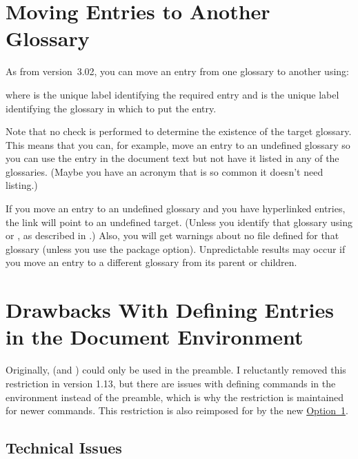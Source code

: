 \documentclass[report,inlinetitle]{nlctdoc}
\newcommand*{\opt}[1]{\hyperlink{option#1}{Option~#1}}
\begin{document}
\section{Moving Entries to Another Glossary}
\label{sec:moveentry}

As from version~3.02, you can move an entry from one glossary to
another using:
\begin{definition}[\DescribeMacro{\glsmoveentry}]
\end{definition}
where  is the unique label identifying the required
entry and  is the unique label
identifying the glossary in which to put the entry.

Note that no check is performed to determine the existence of
the target glossary. This means that you can, for example, move an
entry to an undefined glossary so you can use the entry in the
document text but not have it listed in any of the glossaries.
(Maybe you have an acronym that is so common it doesn't need listing.)

\begin{important}
If you move an entry to an undefined glossary and you have
hyperlinked entries, the link will point to an undefined target.
(Unless you identify that glossary using  or
, as described in .)
Also, you will get warnings about no file defined for that glossary
(unless you use the  package option). Unpredictable
results may occur if you move an entry to a different glossary from
its parent or children.
\end{important}

\section{Drawbacks With Defining Entries in the Document Environment}
\label{sec:docdefs}

Originally,  (and ) could only be 
used in the preamble. I reluctantly removed this restriction in version 1.13,
but there are issues with defining commands in the 
environment instead of the preamble, which is why the restriction is
maintained for newer commands. This restriction is also reimposed
for  by the new \opt1.

\subsection{Technical Issues}
\label{sec:techissues}
\end{document}
